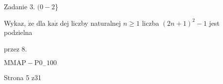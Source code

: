 \documentclass[a4paper,12pt]{article}
\begin{document}
Zadanie 3. $(0-2$\}

Wykaz, $\dot{\mathrm{z}}\mathrm{e}$ dla $\mathrm{k}\mathrm{a}\dot{\mathrm{z}}$ dej liczby naturalnej $n\geq 1$ liczba $(2n+1)^{2}-1$ jest podzielna

przez 8.

$\mathrm{M}\mathrm{M}\mathrm{A}\mathrm{P}-\mathrm{P}0_{-}100$

Strona 5 z31
\end{document}
